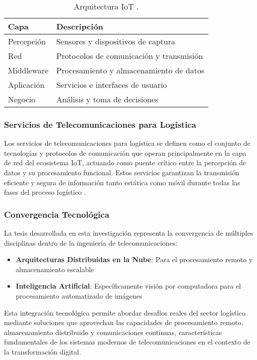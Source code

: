 \begin{table}[H]
\centering
\caption{Arquitectura IoT \cite{Zhou2022}.}
\label{tab:arquitectura_iot}
\begin{tabular}{@{}ll@{}}
\toprule
\textbf{Capa} & \textbf{Descripción} \\
\midrule
Percepción & Sensores y dispositivos de captura \\
Red & Protocolos de comunicación y transmisión \\
Middleware & Procesamiento y almacenamiento de datos \\
Aplicación & Servicios e interfaces de usuario \\
Negocio & Análisis y toma de decisiones \\
\bottomrule
\end{tabular}
\end{table}

\subsubsection{Servicios de Telecomunicaciones para Logística}

Los servicios de telecomunicaciones para logística se definen como el conjunto de tecnologías y protocolos de comunicación que operan principalmente en la capa de red del ecosistema IoT, actuando como puente crítico entre la percepción de datos y su procesamiento funcional. Estos servicios garantizan la transmisión eficiente y segura de información tanto estática como móvil durante todas las fases del proceso logístico \cite{Zhou2022}.

\subsubsection{Convergencia Tecnológica}

La tesis desarrollada en esta investigación representa la convergencia de múltiples disciplinas dentro de la ingeniería de telecomunicaciones:

\begin{itemize}
    \item \textbf{Arquitecturas Distribuidas en la Nube}: Para el procesamiento remoto y almacenamiento escalable
    \item \textbf{Inteligencia Artificial}: Específicamente visión por computadora para el procesamiento automatizado de imágenes
\end{itemize}

Esta integración tecnológica permite abordar desafíos reales del sector logístico mediante soluciones que aprovechan las capacidades de procesamiento remoto, almacenamiento distribuido y comunicaciones continuas, características fundamentales de los sistemas modernos de telecomunicaciones en el contexto de la transformación digital.

